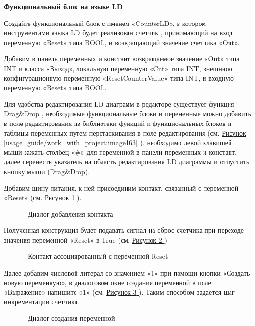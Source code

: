 \documentclass[letterpaper,10pt,russian]{sphinxmanual}
\begin{document}
\textbf{Функциональный блок на языке LD}

Создайте функциональный блок с именем «CounterLD», в котором
инструментами языка LD будет реализован счетчик , принимающий на вход
переменную «Reset» типа BOOL, и возвращающий значение счетчика «Out».

Добавим в панель переменных и констант возвращаемое значение «Out» типа
INT и класса «Выход», локальную переменную «Cnt» типа INT, внешнюю
конфигурационную переменную «ResetCounterValue» типа INT, и входную
переменную «Reset» типа BOOL.

Для удобства редактирования LD диаграмм в редакторе существует функция
Drag\&Drop , необходимые функциональные блоки и
переменные можно добавить в поле редактирования из библиотеки функций и
функциональных блоков  и таблицы переменных путем
перетаскивания в поле редактирования (см. \hyperref[usage_guide/work_with_project:image163]{Рисунок \ref{usage_guide/work_with_project:image163} }). необходимо левой
клавишей мыши зажать столбец «\#» для переменной в панели переменных и
констант, далее перенести указатель на область редактирования LD
диаграммы и отпустить кнопку мыши (Drag\&Drop).

Добавим шину питания, к ней присоединим контакт, связанный с переменной
«Reset» (см. \hyperref[usage_guide/work_with_project:image183]{Рисунок \ref{usage_guide/work_with_project:image183} }).
\begin{figure}[htbp]
\centering
\capstart

\noindent{}
\caption{- Диалог добавления контакта}\label{usage_guide/work_with_project:image183}\end{figure}

Полученная конструкция будет подавать сигнал на сброс счетчика при
переходе значения переменной «Reset» в True (см. \hyperref[usage_guide/work_with_project:image184]{Рисунок \ref{usage_guide/work_with_project:image184} })
\begin{figure}[htbp]
\centering
\capstart

\noindent{}
\caption{- Контакт ассоциированный с переменной Reset}\label{usage_guide/work_with_project:image184}\end{figure}

Далее добавим числовой литерал со значением «1» при
помощи кнопки «Создать новую переменную», в диалоговом окне создания
переменной в поле «Выражение» напишите «1» (см. \hyperref[usage_guide/work_with_project:image165]{Рисунок \ref{usage_guide/work_with_project:image165} }). Таким способом
задается шаг инкрементации счетчика.
\begin{figure}[htbp]
\centering
\capstart

\noindent{}
\caption{- Диалог создания переменной}\label{usage_guide/work_with_project:image165}\end{figure}
\end{document}
